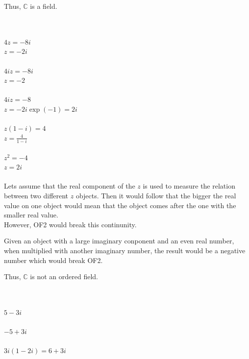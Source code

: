 \documentclass[12pt]{article}
\begin{document}
Thus, $\mathbb{C}$ is a field.

\\

\\
$4z = -8i$\\
$z = -2i$\\

\\
$4iz = -8i$\\
$z = -2$\\

\\
$4iz = -8$\\
$z = -2i\exp(-1) = 2i$\\


\\
$z(1-i) = 4$\\
$z = \frac{4}{1-i}$\\


\\
$z^2 = -4$\\
$z = 2i$\\


\\

Lets assume that the real component of the $z$ is used to measure the relation between two different $z$ objects. 
Then it would follow that the bigger the real value on one object would mean that the object comes after the one with the smaller real value.\\

However, OF2 would break this continunity. 

Given an object with a large imaginary conponent and an even real number, when multiplied with another imaginary number, the result would be a negative number which would break OF2. 

Thus, $\mathbb{C}$ is not an ordered field.

\\

\\
$5 - 3i$\\

\\
$-5 + 3i$\\

\\
$3i(1-2i) = 6+3i$\\
\end{document}

